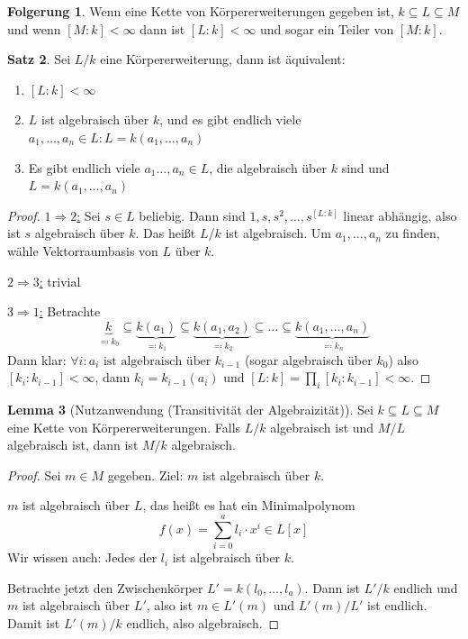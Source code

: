 \documentclass[12pt,parskip=full]{scrartcl}
\newcommand{\heading}{\underline}
\theoremstyle{definition}
\newtheorem{theorem}{Satz}[section]
\newtheorem{corollary}[theorem]{Folgerung}
\newtheorem{lemma}[theorem]{Lemma}
\theoremstyle{remark}
\begin{document}
	\begin{corollary}
		Wenn eine Kette von Körpererweiterungen gegeben ist, $k \subseteq L \subseteq M$ und wenn $[M:k] < \infty$ dann ist $[L:k] < \infty$ und sogar ein Teiler von $[M:k]$.
	\end{corollary}

	\begin{theorem}
		\label{thm:1_27}
		Sei $L/k$ eine Körpererweiterung, dann ist äquivalent:
		\begin{enumerate}
			\item $[L:k] < \infty$
			\item $L$ ist algebraisch über $k$, und es gibt endlich viele $a_1, \dots, a_n \in L: L = k(a_1, \dots, a_n)$
			\item Es gibt endlich viele $a_1 \dots, a_n \in L$, die algebraisch über $k$ sind und $L = k(a_1, \dots, a_n)$
		\end{enumerate}
	\end{theorem}

	\begin{proof}
		\heading{$1 \Rightarrow 2$:} Sei $s \in L$ beliebig. Dann sind $1,s,s^2, \dots, s^{[L:k]}$ linear abhängig, also ist $s$ algebraisch über $k$. Das heißt $L/k$ ist algebraisch.
		Um $a_1, \dots, a_n$ zu finden, wähle Vektorraumbasis von $L$ über $k$.
		
		\heading{$2 \Rightarrow 3$:} trivial
		
		\heading{$3 \Rightarrow 1$:} Betrachte
		\begin{equation*}
			\underbrace{k}_{\eqqcolon k_0} \subseteq \underbrace{k(a_1)}_{\eqqcolon k_1} \subseteq \underbrace{k(a_1, a_2)}_{\eqqcolon k_2} \subseteq \dots \subseteq \underbrace{k(a_1, \dots, a_n)}_{\eqqcolon k_n}
		\end{equation*}
		Dann klar: $\forall i: a_i \text{ ist algebraisch über } k_{i-1}$ (sogar algebraisch über $k_0$) also $[k_i: k_{i-1}] < \infty$, dann $k_i = k_{i-1}(a_i)$ und $[L:k] = \prod_i [k_i: k_{i-1}] < \infty$.
	\end{proof}

	\begin{lemma}[Nutzanwendung (Transitivität der Algebraizität)]
		Sei $k \subseteq L \subseteq M$ eine Kette von Körpererweiterungen. Falls $L/k$ algebraisch ist und $M/L$ algebraisch ist, dann ist $M/k$ algebraisch.
	\end{lemma}

	\begin{proof}
		Sei $m \in M$ gegeben. Ziel: $m$ ist algebraisch über $k$.
		
		$m$ ist algebraisch über $L$, das heißt es hat ein Minimalpolynom
		\begin{equation*}
			f(x) = \sum_{i=0}^a l_i \cdot x^i \in L[x]
		\end{equation*}
		Wir wissen auch: Jedes der $l_i$ ist algebraisch über $k$.
		
		Betrachte jetzt den Zwischenkörper $L' = k(l_0, \dots, l_a)$. Dann ist $L'/k$ endlich und $m$ ist algebraisch über $L'$, also ist $m \in L'(m)$ und $L'(m)/L'$ ist endlich. Damit ist $L'(m)/k$ endlich, also algebraisch.
	\end{proof}
\end{document}
